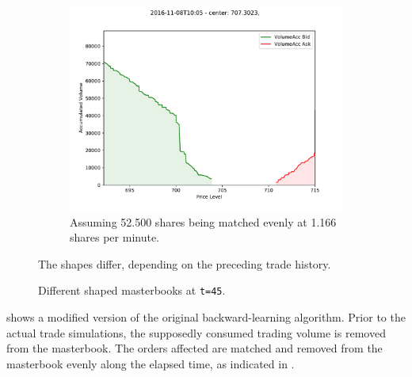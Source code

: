 \begin{figure}[ht]
\begin{subfigure}[t]{0.3\textwidth}
    	\end{subfigure}%
	\begin{subfigure}[t]{0.3\textwidth}
        		\centering
        		\includegraphics[width=\textwidth]{content/drawings/masterbook_customstart_SimEqual}
        		\caption{Assuming 52.500 shares being matched evenly at 1.166 shares per minute.}
		\label{fig:differingmasterbooks:SimEq}
    	\end{subfigure}%

	\caption{Different shaped masterbooks at \lstinline!t=45!.}
	\small The shapes differ, depending on the preceding trade history.
	\label{fig:differingmasterbooks}
\end{figure}

 shows a modified version of the original backward-learning algorithm. Prior to the actual trade simulations, the supposedly consumed trading volume is removed from the masterbook. The orders affected are matched and removed from the masterbook evenly along the elapsed time, as indicated in .\\

